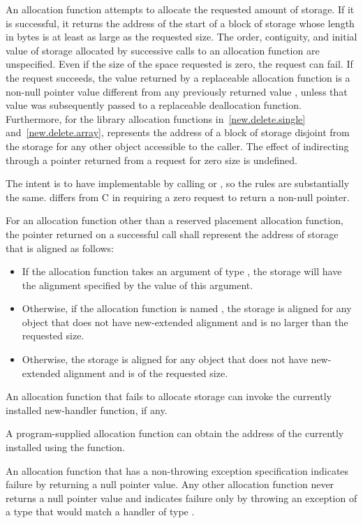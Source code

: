 \pnum
An allocation function attempts to allocate the requested amount of
storage. If it is successful, it returns the address of the start
of a block of storage whose length in bytes is at least as large
as the requested size.
The order,
contiguity, and initial value of storage allocated by successive calls
to an allocation function are unspecified.
Even if the size of the space
requested is zero, the request can fail. If the request succeeds, the
value returned by a replaceable allocation function
is a non-null pointer value
 different from any previously returned value ,
unless that value  was subsequently passed to a
replaceable deallocation function.
Furthermore, for the library allocation functions
in~\ref{new.delete.single} and~\ref{new.delete.array},
 represents the address of a block of storage disjoint from the storage
for any other object accessible to the caller.
The effect of indirecting through a pointer
returned from a request for zero size is undefined.
\begin{footnote}
The intent is
to have  implementable by
calling  or , so the rules are
substantially the same. \Cpp{} differs from C in requiring a zero request
to return a non-null pointer.
\end{footnote}

\pnum
For an allocation function other than
a reserved placement allocation function,
the pointer returned on a successful call
shall represent the address of storage that is aligned as follows:
\begin{itemize}
\item
  If the allocation function takes an argument
  of type ,
  the storage will have the alignment specified
  by the value of this argument.
\item
  Otherwise, if the allocation function is named ,
  the storage is aligned for any object that
  does not have new-extended alignment and
  is no larger than the requested size.
\item
  Otherwise, the storage is aligned for any object that
  does not have new-extended alignment and is of the requested size.
\end{itemize}

\pnum
An allocation function that fails to allocate storage can invoke the
currently installed new-handler function, if any.
\begin{note}
%
A program-supplied allocation function can obtain the address of the
currently installed  using the
 function.
\end{note}
An allocation function that has a non-throwing
exception specification
indicates failure by returning
a null pointer value.
Any other allocation function
never returns a null pointer value and
indicates failure only by throwing an exception of a type
that would match a handler of type
.

